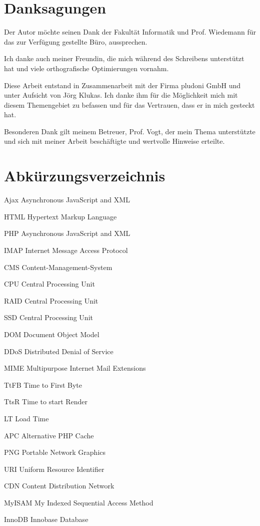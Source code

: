   \section*{Danksagungen}
 
 Der Autor möchte seinen Dank der Fakultät Informatik und Prof. Wiedemann für das zur Verfügung gestellte Büro, aussprechen. 
 
 Ich danke auch meiner Freundin, die mich während des Schreibens unterstützt hat und viele orthografische Optimierungen vornahm.
 
 Diese Arbeit entstand in Zusammenarbeit mit der Firma pludoni GmbH und unter Aufsicht von Jörg Klukas. Ich danke ihm für die Möglichkeit mich mit diesem Themengebiet zu befassen und für das Vertrauen, dass er in mich gesteckt hat.
 
 Besonderen Dank gilt meinem Betreuer, Prof. Vogt, der mein Thema unterst\"utzte und sich mit meiner Arbeit beschäftigte und wertvolle Hinweise erteilte.
 \newpage
\section*{Abk\"urzungsverzeichnis}
\begin{basedescript}{\desclabelstyle{\pushlabel}\desclabelwidth{6em}}
  \item[Ajax] Asynchronous JavaScript and XML
  \item[HTML] Hypertext Markup Language
  \item[PHP] Asynchronous JavaScript and XML
  \item[IMAP] Internet Message Access Protocol
  \item[CMS] Content-Management-System
  \item[CPU] Central Processing Unit
  \item[RAID] Central Processing Unit
  \item[SSD] Central Processing Unit
  \item[DOM] Document Object Model
  \item[DDoS] Distributed Denial of Service
  \item[MIME] Multipurpose Internet Mail Extensions
  \item[TtFB] Time to First Byte
  \item[TtsR] Time to start Render
  \item[LT] Load Time
  \item[APC] Alternative PHP Cache
  \item[PNG] Portable Network Graphics
  \item[URI] Uniform Resource Identifier
  \item[CDN] Content Distribution Network
\item[MyISAM] My Indexed Sequential Access Method
 \item[InnoDB] Innobase Database
  
\end{basedescript}
